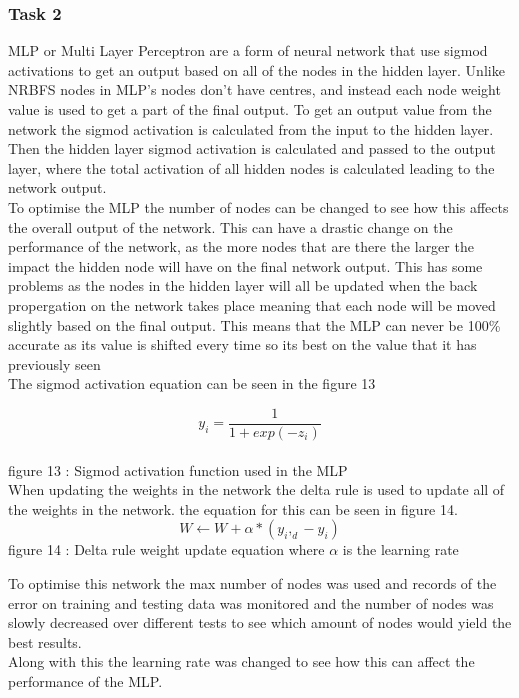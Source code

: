 \documentclass{IEEEtran}
\begin{document}
\subsubsection{Task 2}
\begin{flushleft}
  MLP or Multi Layer Perceptron are a form of neural network that use sigmod activations
  to get an output based on all of the nodes in the hidden layer. Unlike NRBFS nodes in
  MLP's nodes don't have centres, and instead each node weight value is used to get a
  part of the final output. To get an output value from the network the sigmod activation
  is calculated from the input to the hidden layer. Then the hidden layer sigmod activation
  is calculated and passed to the output layer, where the total activation of all hidden
  nodes is calculated leading to the network output.
  \\
  \vspace{1.5mm}
  To optimise the MLP the number of nodes can be changed to see how this affects the overall
  output of the network. This can have a drastic change on the performance of the network, as
  the more nodes that are there the larger the impact the hidden node will have on the final
  network output. This has some problems as the nodes in the hidden layer will all be updated
  when the back propergation on the network takes place meaning that each node will be moved
  slightly based on the final output. This means that the MLP can never be 100\% accurate
  as its value is shifted every time so its best on the value that it has previously seen
  \\
  \vspace{1.5mm}
  The sigmod activation equation can be seen in the figure 13

$$y_i=\frac{1}{1+exp(-z_i)}$$
\\
\vspace{1.5mm}
{\footnotesize figure 13 : Sigmod activation function used in the MLP}
\\
\vspace{1.5mm}
When updating the weights in the network the delta rule is used to update all of
the weights in the network. the equation for this can be seen in figure 14.
$$W \leftarrow W  + \alpha*(y_i,_d - y_i)$$
{\footnotesize figure 14 : Delta rule weight update equation where $\alpha$ is the learning
rate}
\\
\vspace{1.5mm}

To optimise this network the max number of nodes was used and records of the error on training
and testing data was monitored and the number of nodes was slowly decreased over different tests
to see which amount of nodes would yield the best results.
\\
\vspace{1.5mm}
Along with this the learning rate was changed to see how this can affect the performance of the MLP.
 

\end{flushleft}
\end{document}
